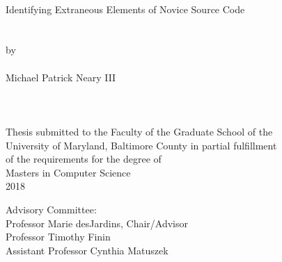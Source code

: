 
\thispagestyle{empty}
\hbox{\ }
\vspace{1in}
\renewcommand{\baselinestretch}{1}
\small\normalsize
\begin{center}

\large{Identifying Extraneous Elements of Novice Source Code}\\
\ \\
\ \\
\large{by} \\
\ \\
\large{Michael Patrick Neary III}%
\ \\
\ \\
\ \\
\ \\
\normalsize
Thesis submitted to the Faculty of the Graduate School of the \\
University of Maryland, Baltimore County in partial fulfillment \\
of the requirements for the degree of \\
Masters in Computer Science \\
2018
\end{center}

\vspace{7.5em}

\noindent Advisory Committee: \\
Professor Marie desJardins, Chair/Advisor \\
Professor Timothy Finin \\
Assistant Professor Cynthia Matuszek

